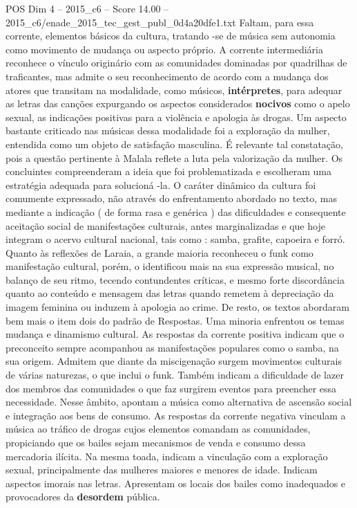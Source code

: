 \begin{textsample}{POS Dim 4 – 2015\_c6 – Score 14.00 – 2015\_c6/enade\_2015\_tec\_gest\_publ\_0d4a20dfe1.txt}
Faltam, para essa corrente, elementos básicos da cultura, tratando -se de música sem autonomia como movimento de mudança ou aspecto próprio.
A corrente intermediária reconhece o vínculo originário com as comunidades dominadas por quadrilhas de traficantes, mas admite o seu reconhecimento de acordo com a mudança dos atores que transitam na modalidade, como músicos, \textbf{intérpretes}, para adequar as letras das canções expurgando os aspectos considerados \textbf{nocivos} como o apelo sexual, as indicações positivas para a violência e apologia às drogas.
Um aspecto bastante criticado nas músicas dessa modalidade foi a exploração da mulher, entendida como um objeto de satisfação masculina.
É relevante tal constatação, pois a questão pertinente à Malala reflete a luta pela valorização da mulher.
Os concluintes compreenderam a ideia que foi problematizada e escolheram uma estratégia adequada para solucioná -la.
O caráter dinâmico da cultura foi comumente expressado, não através do enfrentamento abordado no texto, mas mediante a indicação ( de forma rasa e genérica ) das dificuldades e consequente aceitação social de manifestações culturais, antes marginalizadas e que hoje integram o acervo cultural nacional, tais como : samba, grafite, capoeira e forró.
Quanto às reflexões de Laraia, a grande maioria reconheceu o funk como manifestação cultural, porém, o identificou mais na sua expressão musical, no balanço de seu ritmo, tecendo contundentes críticas, e mesmo forte discordância quanto ao conteúdo e mensagem das letras quando remetem à depreciação da imagem feminina ou induzem à apologia ao crime.
De resto, os textos abordaram bem mais o item dois do padrão de Respostas.
Uma minoria enfrentou os temas mudança e dinamismo cultural.
As respostas da corrente positiva indicam que o preconceito sempre acompanhou as manifestações populares como o samba, na sua origem.
Admitem que diante da miscigenação surgem movimentos culturais de várias naturezas, o que inclui o funk.
Também indicam a dificuldade de lazer dos membros das comunidades o que faz surgirem eventos para preencher essa necessidade.
Nesse âmbito, apontam a música como alternativa de ascensão social e integração aos bens de consumo.
As respostas da corrente negativa vinculam a música ao tráfico de drogas cujos elementos comandam as comunidades, propiciando que os bailes sejam mecanismos de venda e consumo dessa mercadoria ilícita.
Na mesma toada, indicam a vinculação com a exploração sexual, principalmente das mulheres maiores e menores de idade.
Indicam aspectos imorais nas letras.
Apresentam os locais dos bailes como inadequados e provocadores da \textbf{desordem} pública.

\end{textsample}
